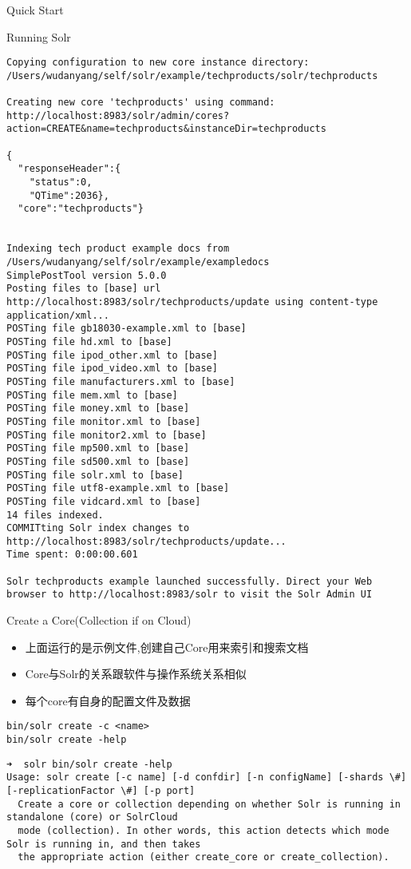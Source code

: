 \documentclass[presentation]{beamer}
\begin{document}
\begin{frame}[fragile,label={sec:org3661264}]{Quick Start}
\begin{block}{Running Solr}
\begin{verbatim}
Copying configuration to new core instance directory:
/Users/wudanyang/self/solr/example/techproducts/solr/techproducts

Creating new core 'techproducts' using command:
http://localhost:8983/solr/admin/cores?action=CREATE&name=techproducts&instanceDir=techproducts

{
  "responseHeader":{
    "status":0,
    "QTime":2036},
  "core":"techproducts"}


Indexing tech product example docs from /Users/wudanyang/self/solr/example/exampledocs
SimplePostTool version 5.0.0
Posting files to [base] url http://localhost:8983/solr/techproducts/update using content-type application/xml...
POSTing file gb18030-example.xml to [base]
POSTing file hd.xml to [base]
POSTing file ipod_other.xml to [base]
POSTing file ipod_video.xml to [base]
POSTing file manufacturers.xml to [base]
POSTing file mem.xml to [base]
POSTing file money.xml to [base]
POSTing file monitor.xml to [base]
POSTing file monitor2.xml to [base]
POSTing file mp500.xml to [base]
POSTing file sd500.xml to [base]
POSTing file solr.xml to [base]
POSTing file utf8-example.xml to [base]
POSTing file vidcard.xml to [base]
14 files indexed.
COMMITting Solr index changes to http://localhost:8983/solr/techproducts/update...
Time spent: 0:00:00.601

Solr techproducts example launched successfully. Direct your Web browser to http://localhost:8983/solr to visit the Solr Admin UI
\end{verbatim}
\end{block}


\begin{block}{Create a Core(Collection if on Cloud)}
\begin{itemize}
\item 上面运行的是示例文件,创建自己Core用来索引和搜索文档
\item Core与Solr的关系跟软件与操作系统关系相似
\item 每个core有自身的配置文件及数据
\end{itemize}
\begin{verbatim}
bin/solr create -c <name>
bin/solr create -help
\end{verbatim}
\begin{verbatim}
➜  solr bin/solr create -help
Usage: solr create [-c name] [-d confdir] [-n configName] [-shards \#] [-replicationFactor \#] [-p port]
  Create a core or collection depending on whether Solr is running in standalone (core) or SolrCloud
  mode (collection). In other words, this action detects which mode Solr is running in, and then takes
  the appropriate action (either create_core or create_collection).
\end{verbatim}
\end{block}



\end{frame}
\end{document}
